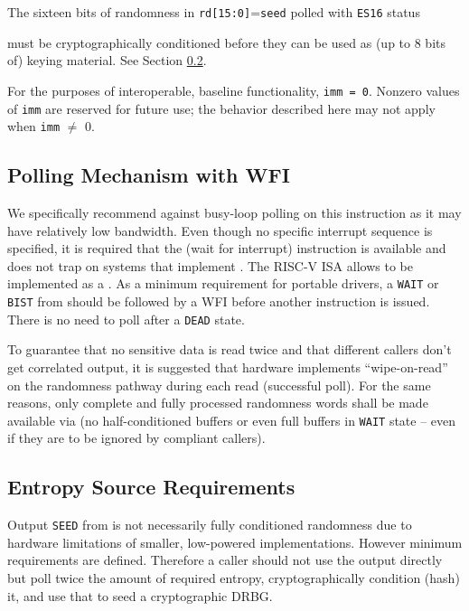     The sixteen bits of randomness in \verb|rd[15:0]|=\verb|seed| polled
    with \verb|ES16| status {must be cryptographically conditioned
    before they can be used as (up to 8 bits of) keying material.
    See Section \ref{sec:req-es}.

    For the purposes of interoperable, baseline functionality, \verb|imm = 0|.
    Nonzero values of \verb|imm| are reserved for future use; the behavior
    described here may not apply when \verb|imm| $\neq$ 0.


\subsection{Polling Mechanism with WFI}
\label{sec:es-polling}

    We specifically recommend against busy-loop polling on this instruction
    as it may have relatively low bandwidth. Even though no specific interrupt
    sequence is specified, it is required that the  (wait for
    interrupt) instruction is available and does not trap on systems that
    implement . The RISC-V ISA allows  to be
    implemented as a .
    As a minimum requirement for portable drivers, a \verb|WAIT| or
    \verb|BIST| from  should be followed by a WFI before
    another  instruction is issued. There is
    no need to poll after a \verb|DEAD| state.

    To guarantee that no sensitive data is read twice and that different
    callers don't get correlated output, it is suggested that hardware
    implements ``wipe-on-read'' on the randomness
    pathway during each read (successful poll). For the same reasons, only complete
    and fully processed randomness words shall be made available via
     (no half-conditioned buffers or even full buffers
    in \verb|WAIT| state -- even if they are to be ignored by compliant
    callers).


\subsection{Entropy Source Requirements}
\label{sec:req-es}

    Output \verb|SEED| from  is not necessarily fully
    conditioned randomness due to hardware limitations of smaller,
    low-powered implementations. However minimum requirements are
    defined. Therefore a caller should not use the output directly but poll
    twice the amount of required entropy, cryptographically condition
    (hash) it, and use that to seed a cryptographic DRBG.

}
